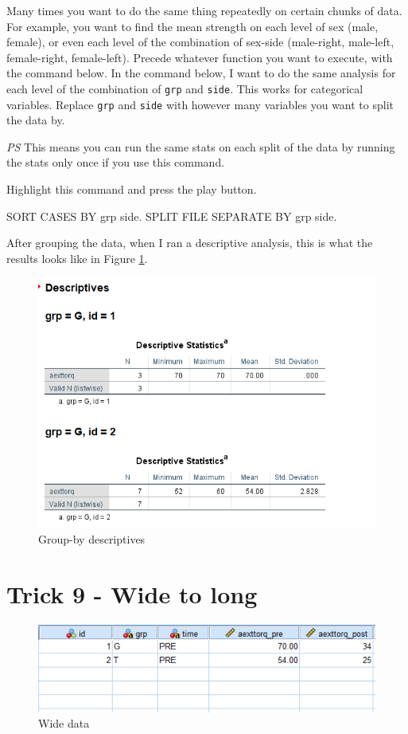 \documentclass[
]{book}
\newenvironment{Shaded}{\begin{snugshade}}{\end{snugshade}}
\newcommand{\NormalTok}[1]{#1}
\begin{document}
Many times you want to do the same thing repeatedly on certain chunks of data. For example, you want to find the mean strength on each level of sex (male, female), or even each level of the combination of sex-side (male-right, male-left, female-right, female-left). Precede whatever function you want to execute, with the command below. In the command below, I want to do the same analysis for each level of the combination of \texttt{grp} and \texttt{side}. This works for categorical variables. Replace \texttt{grp} and \texttt{side} with however many variables you want to split the data by.

\emph{PS} This means you can run the same stats on each split of the data by running the stats only once if you use this command.

Highlight this command and press the play button.

\begin{Shaded}
\begin{Highlighting}[]
\NormalTok{SORT CASES  BY grp side.}
\NormalTok{SPLIT FILE SEPARATE BY grp side.}
\end{Highlighting}
\end{Shaded}

After grouping the data, when I ran a descriptive analysis, this is what the results looks like in Figure \ref{fig:group-by}.

\begin{figure}
\includegraphics[width=0.6\linewidth]{images/group-by} \caption{Group-by descriptives}\label{fig:group-by}
\end{figure}

\hypertarget{trick9}{%
\chapter{Trick 9 - Wide to long}\label{trick9}}

\begin{figure}
\includegraphics[width=1\linewidth]{images/wide_data} \caption{Wide data}\label{fig:ugly}
\end{figure}
\end{document}
